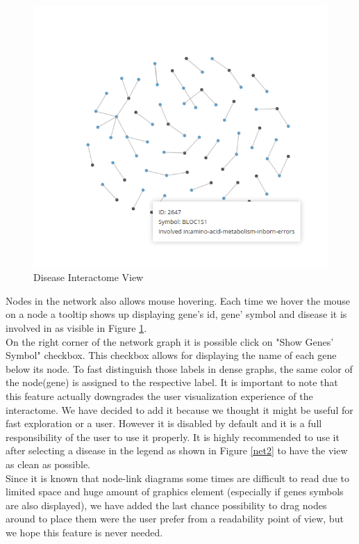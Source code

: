 \documentclass[12pt,twocolumn,twoside]{article}
\begin{document}
\begin{figure}
	\includegraphics[width=.95\linewidth]{network.png}
	\caption{Disease Interactome View}
	\label{net}
\end{figure}

Nodes in the network also allows mouse hovering. Each time we hover the mouse on a node a tooltip shows up displaying gene's id, gene' symbol and disease it is involved in as visible in Figure \ref{net}.\\
On the right corner of the network graph it is possible  click on "Show Genes' Symbol" checkbox. This checkbox allows for displaying the name of each gene below its node. To fast distinguish those labels in dense graphs, the same color of the node(gene) is assigned to the respective label. It is important to note that this feature actually downgrades the user visualization experience of the interactome. We have decided to add it because we thought it might be useful for fast exploration or a user. However it is disabled by default and it is a full responsibility of the user to use it properly. It is highly recommended to use it after selecting a disease in the legend as shown in Figure \ref{net2} to have the view as clean as possible.\\ 
Since it is known that node-link diagrams some times are difficult to read due to limited space and huge amount of graphics element (especially if genes symbols are also displayed), we have added the last chance possibility to drag nodes around to place them were the user prefer from a readability point of view, but we hope this feature is never needed.
\end{document}
